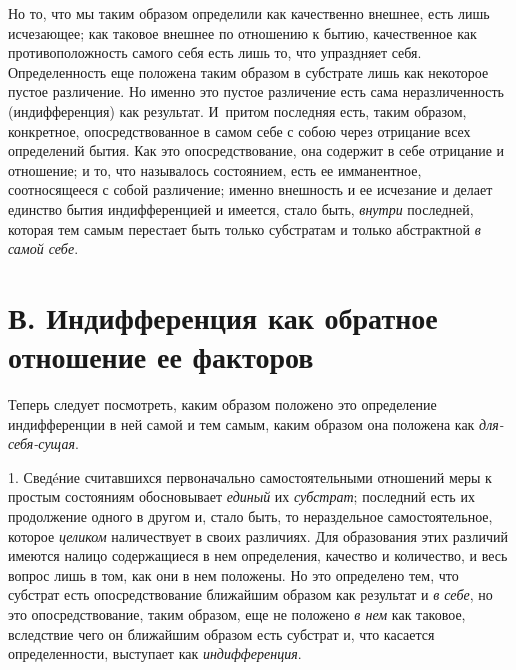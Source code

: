 Но то, что мы таким образом определили как качественно внешнее, есть лишь
исчезающее; как таковое внешнее по отношению к бытию, качественное как
противоположность самого себя есть лишь то, что упраздняет себя.
Определенность еще положена таким образом в субстрате лишь как некоторое
пустое различение. Но именно это пустое различение есть сама
неразличенность (индифференция) как результат. И~притом последняя есть,
таким образом, конкретное, опосредствованное в самом себе с собою через
отрицание всех определений бытия. Как это опосредствование, она содержит в
себе отрицание и отношение; и то, что называлось состоянием, есть ее
имманентное, соотносящееся с собой различение; именно внешность и ее
исчезание и делает единство бытия индифференцией и имеется, стало быть,
{\em внутри} последней, которая тем самым перестает
быть только субстратам и только абстрактной {\em в самой себе}.

\section[В. Индифференция как обратное отношение ее факторов]{В. Индифференция как обратное отношение ее факторов}
Теперь следует посмотреть, каким
образом положено это определение индифференции в ней самой и тем самым,
каким образом она положена как {\em для-себя-сущая}.

1. Сведéние считавшихся первоначально самостоятельными отношений меры к
простым состояниям обосновывает {\em единый} их
{\em субстрат}; последний есть их продолжение одного в
другом и, стало быть, то нераздельное самостоятельное, которое
{\em целиком} наличествует в своих различиях. Для
образования этих различий имеются налицо содержащиеся в нем определения,
качество и количество, и весь вопрос лишь в том, как они в нем положены. Но
это определено тем, что субстрат есть опосредствование ближайшим образом
как результат и {\em в себе}, но это опосредствование,
таким образом, еще не положено {\em в нем} как таковое,
вследствие чего он ближайшим образом есть субстрат и, что касается
определенности, выступает как {\em индифференция}.

